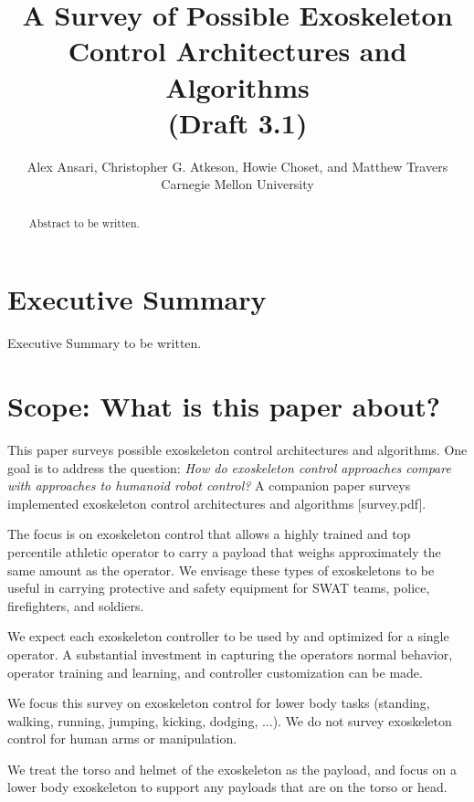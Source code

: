 \documentclass[letterpaper,12pt,fullpage]{article}
\begin{document}
\title{A Survey of Possible Exoskeleton Control Architectures and
Algorithms\\
(Draft 3.1)}

\author{Alex Ansari, Christopher G. Atkeson, Howie Choset, and Matthew Travers\\
Carnegie Mellon University}

\maketitle

\begin{abstract}
Abstract to be written.
\end{abstract}

\section{Executive Summary}

Executive Summary to be written.

\section{Scope: What is this paper about?}

This paper surveys possible exoskeleton control architectures and
algorithms.
One goal is to address the question:
{\it How do exoskeleton control approaches compare with 
approaches to humanoid robot control?}
A companion paper surveys implemented exoskeleton control architectures
and algorithms [survey.pdf].

The focus is on exoskeleton control that allows a
highly trained and top percentile athletic 
operator to carry a payload that weighs approximately the same amount
as the operator. We envisage these types of exoskeletons to be useful
in carrying protective and safety equipment for SWAT teams, police,
firefighters, and soldiers. 

We expect each exoskeleton controller
to be used by and optimized for a single operator.
A substantial investment in capturing the operators normal behavior,
operator training and learning, and controller customization can be made.

We focus this survey on exoskeleton control for lower body tasks (standing, walking,
running, jumping, kicking, dodging, ...).
We do not survey exoskeleton control for human arms or manipulation. 

We treat the torso and helmet of the exoskeleton as the payload,
and focus on a lower body exoskeleton to support any payloads that
are on the torso or head.
\end{document}
